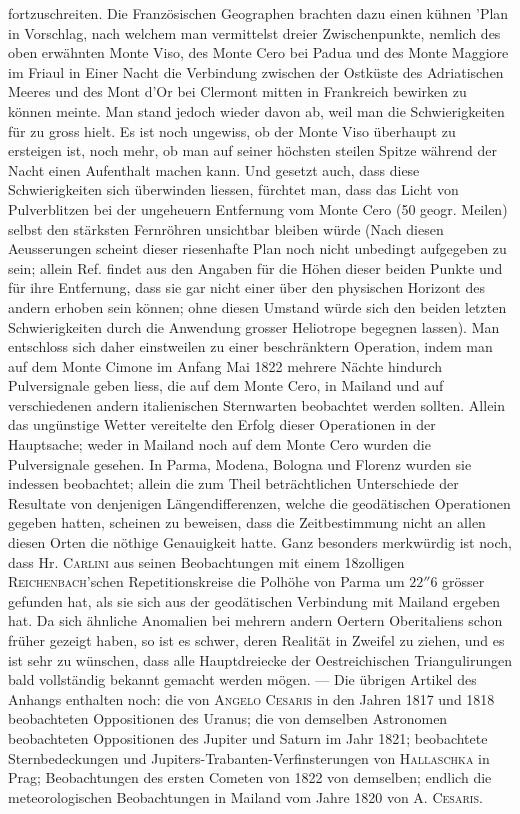 fortzuschreiten. Die Französischen Geographen brachten dazu einen kühnen 'Plan in Vorschlag, nach welchem man vermittelst dreier Zwischenpunkte, nemlich des oben erwähnten Monte Viso, des Monte Cero bei Padua und des Monte Maggiore im Friaul in Einer Nacht die Verbindung zwischen der Ostküste des Adriatischen Meeres und des Mont d'Or bei Clermont mitten in Frankreich bewirken zu können meinte. Man stand jedoch wieder davon ab, weil man die Schwierigkeiten für zu gross hielt. Es ist noch ungewiss, ob der Monte Viso überhaupt zu ersteigen ist, noch mehr, ob man auf seiner höchsten steilen Spitze während der Nacht einen Aufenthalt machen kann. Und gesetzt auch, dass diese Schwierigkeiten sich überwinden liessen, fürchtet man, dass das Licht von Pulverblitzen bei der ungeheuern Entfernung vom Monte Cero (50 geogr. Meilen) selbst den stärksten Fernröhren unsichtbar bleiben würde (Nach diesen Aeusserungen scheint dieser riesenhafte Plan noch nicht unbedingt aufgegeben zu sein; allein Ref. findet aus den Angaben für die Höhen dieser beiden Punkte und für ihre Entfernung, dass sie gar nicht einer über den physischen Horizont des andern erhoben sein können; ohne diesen Umstand würde sich den beiden letzten Schwierigkeiten durch die Anwendung grosser Heliotrope begegnen lassen). Man entschloss sich daher einstweilen zu einer beschränktern Operation, indem man auf dem Monte Cimone im Anfang Mai 1822 mehrere Nächte hindurch Pulversignale geben liess, die auf dem Monte Cero, in Mailand und auf verschiedenen andern italienischen Sternwarten beobachtet werden sollten. Allein das ungünstige Wetter vereitelte den Erfolg dieser Operationen in der Hauptsache; weder in Mailand noch auf dem Monte Cero wurden die Pulversignale gesehen. In Parma, Modena, Bologna und Florenz wurden sie indessen beobachtet; allein die zum Theil beträchtlichen Unterschiede der Resultate von denjenigen Längendifferenzen, welche die geodätischen Operationen gegeben hatten, scheinen zu beweisen, dass die Zeitbestimmung nicht an allen diesen Orten die nöthige Genauigkeit hatte. Ganz besonders merkwürdig ist noch, dass Hr. \textsc{Carlini} aus seinen Beobachtungen mit einem 18zolligen \textsc{Reichenbach}'schen Repetitionskreise die Polhöhe von Parma um $22''6$ grösser gefunden hat, als sie sich aus der geodätischen Verbindung mit Mailand ergeben hat. Da sich ähnliche Anomalien bei mehrern andern Oertern Oberitaliens schon früher gezeigt haben, so ist es schwer, deren Realität in Zweifel zu ziehen, und es ist sehr zu wünschen, dass alle Hauptdreiecke der Oestreichischen Triangulirungen bald vollständig bekannt gemacht werden mögen. --- Die übrigen Artikel des Anhangs enthalten noch: die von \textsc{Angelo Cesaris} in den Jahren 1817 und 1818 beobachteten Oppositionen des Uranus; die von demselben Astronomen beobachteten Oppositionen des Jupiter und Saturn im Jahr 1821; beobachtete Sternbedeckungen und Jupiters-Trabanten-Verfinsterungen von \textsc{Hallaschka} in Prag; Beobachtungen des ersten Cometen von 1822 von demselben; endlich die meteorologischen Beobachtungen in Mailand vom Jahre 1820 von A. \textsc{Cesaris}.
